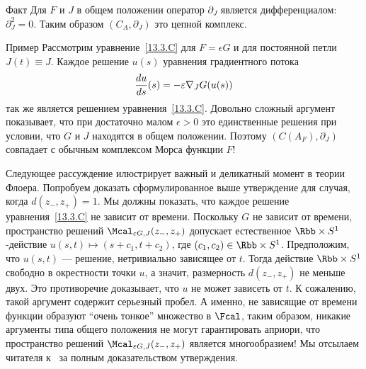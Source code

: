 \begin{thm}{Факт}\label{13.3.F}
  Для $F$ и $J$ в общем положении оператор $\partial_{J}$ является
  дифференциалом: $\partial_{J}^{2}=0$.
  Таким образом $(C_{A},\partial_{J})$ это цепной комплекс.
\end{thm}

\begin{thm}{Пример}\label{13.3.G}
  Рассмотрим уравнение~\ref{13.3.C} для $F = \epsilon G$ и для
  постоянной петли $J(t)\equiv J$.
  Каждое решение $u(s)$ уравнения градиентного потока
  \[
  \frac{d u}{d s} (s) = -\varepsilon\nabla_{J} G(u(s))
  \]
  так же является решением уравнения~\ref{13.3.C}.
  Довольно сложный аргумент \cite[Lemma 7.1]{HS} показывает, что при
  достаточно малом $\epsilon>0$ это единственные решения при
  условии, что $G$ и $J$ находятся в общем положении.
  Поэтому $(C(A_{F}),\partial_{J})$ совпадает с обычным комплексом
  Морса функции $F$!
\end{thm}

Следующее рассуждение илюстрирует важный и деликатный
момент в теории Флоера.
Попробуем доказать сформулированное выше утверждение для случая, когда
$d(z_{-}, z_{+})=1$.  
Мы должны показать, что каждое решение уравнения~\ref{13.3.C} не
зависит от времени.
Поскольку $G$ не зависит от времени, пространство решений
$\Mcal_{\epsilon G,J}(z_{-},z_{+})$ допускает естественное $\Rbb\times
S^{1}$-действие $u(s, t) \mapsto (s+c_{1},t+c_{2})$, где
$(c_{1},c_{2})\in\Rbb\times S^{1}$.
Предположим, что $u(s, t)$ --- решение, нетривиально зависящее от $t$.
Тогда действие $\Rbb\times S^{1}$ свободно в окрестности точки $u$,
а значит, размерность $d(z_{-}, z_{+})$ не меньше двух.
Это противоречие доказывает, что $u$ не может зависеть от $t$.
К сожалению, такой аргумент содержит серьезный пробел.
А именно, не зависящие от времени функции образуют ``очень тонкое''
множество в $\Fcal$, таким образом, никакие аргументы типа общего
положения не могут гарантировать априори, что пространство решений
$\Mcal_{\epsilon G,J}(z_{-}, z_{+})$ является многообразием!
Мы отсылаем читателя к~\cite{HS} за полным доказательством утверждения.

